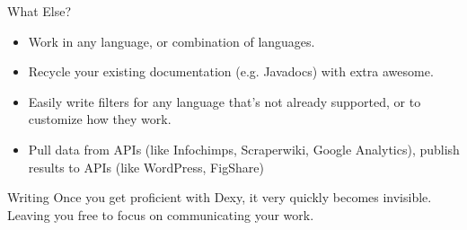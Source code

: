 \documentclass{beamer}
\begin{document}
\begin{frame}{What Else?}
\begin{itemize}
\item{Work in any language, or combination of languages.}
\item{Recycle your existing documentation (e.g. Javadocs) with extra awesome.}
\item{Easily write filters for any language that's not already supported, or to customize how they work.}
\item{Pull data from APIs (like Infochimps, Scraperwiki, Google Analytics), publish results to APIs (like WordPress, FigShare)}
\end{itemize}
\end{frame}

\begin{frame}{Writing}
Once you get proficient with Dexy, it very quickly becomes invisible.
Leaving you free to focus on communicating your work.
\end{frame}
\end{document}

